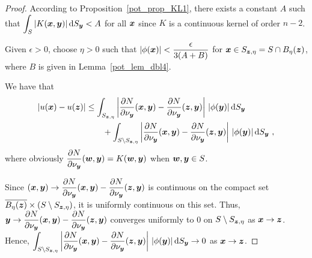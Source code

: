 \begin{proof}
According to Proposition~\ref{pot_prop_KL1}, there exists a constant $A$
such that $\displaystyle \int_S |K({\bm{x}},{\bm{y}})| \,\mathrm{d}{S}_{{\bm{y}}} < A$
for all ${\bm{x}}$ since $K$ is a continuous kernel of order $n-2$.

Given $\epsilon > 0$, choose $\eta > 0$ such that
$\displaystyle |\phi({\bm{x}})| < \frac{\epsilon}{3(A+B)}$
for ${\bm{x}} \in S_{{\bm{z}},\eta} = S \cap B_{\eta}({\bm{z}})$, where $B$ is
given in Lemma~\ref{pot_lem_dbl4}.

We have that
\begin{equation} \label{potLemDbl5equ1}
\begin{split}
|u({\bm{x}}) - u({\bm{z}})|
& \leq \int_{S_{{\bm{z}},\eta}} \left| \frac{\partial{N}}{\partial \nu_{{\bm{y}}}}
({\bm{x}},{\bm{y}}) - \frac{\partial{N}}{\partial \nu_{{\bm{y}}}} ({\bm{z}},{\bm{y}})
\right|\,|\phi({\bm{y}})| \,\mathrm{d}{S}_{{\bm{y}}} \\
&\qquad + \int_{S \setminus S_{{\bm{z}},\eta}} \left| \frac{\partial{N}}{\partial \nu_{{\bm{y}}}}
({\bm{x}},{\bm{y}}) - \frac{\partial{N}}{\partial \nu_{{\bm{y}}}} ({\bm{z}},{\bm{y}})
\right|\,|\phi({\bm{y}})| \,\mathrm{d}{S}_{{\bm{y}}} \ ,
\end{split}
\end{equation}
where obviously
$\displaystyle \frac{\partial{N}}{\partial \nu_{{\bm{y}}}} ({\bm{w}},{\bm{y}})
= K({\bm{w}},{\bm{y}})$ when ${\bm{w}}, {\bm{y}} \in S$.

Since
$\displaystyle ({\bm{x}},{\bm{y}}) \to 
\frac{\partial{N}}{\partial \nu_{{\bm{y}}}}
({\bm{x}},{\bm{y}}) - \frac{\partial{N}}{\partial \nu_{{\bm{y}}}} ({\bm{z}},{\bm{y}})$
is continuous on the compact set 
$\displaystyle
\overline{B_\eta({\bm{z}})} \times \left(S \setminus S_{{\bm{z}},\eta}\right)$,
it is uniformly continuous on this set.  Thus,
$\displaystyle {\bm{y}} \to
\frac{\partial{N}}{\partial \nu_{{\bm{y}}}}
({\bm{x}},{\bm{y}}) - \frac{\partial{N}}{\partial \nu_{{\bm{y}}}} ({\bm{z}},{\bm{y}})$
converges uniformly to $0$ on $S \setminus S_{{\bm{z}},\eta}$ as
${\bm{x}} \to {\bm{z}}$.  Hence,
$\displaystyle
\int_{S \setminus S_{{\bm{z}},\eta}} \left| \frac{\partial{N}}{\partial \nu_{{\bm{y}}}}
({\bm{x}},{\bm{y}}) - \frac{\partial{N}}{\partial \nu_{{\bm{y}}}} ({\bm{z}},{\bm{y}})
\right|\,|\phi({\bm{y}})| \,\mathrm{d}{S}_{{\bm{y}}} \to 0$ as
${\bm{x}} \to {\bm{z}}$.


\end{proof}
